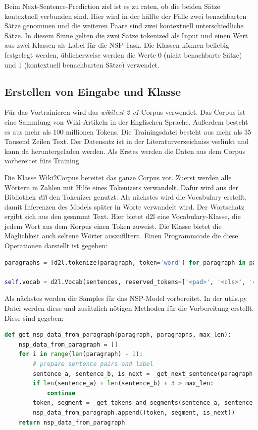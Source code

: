 Beim Next-Sentence-Prediction ziel ist es zu raten, ob die beiden Sätze kontextuell verbunden sind. Hier wird in der hälfte der Fälle zwei benachbarten Sätze genommen und die weiteren Paare sind zwei kontextuell unterschiedliche Sätze. In diesem Sinne gelten die zwei Sätze tokenized als Input und einen Wert aus zwei Klassen als Label für die NSP-Task. Die Klassen können beliebig festgelegt werden, üblicherweise werden die Werte 0 (nicht benachbarte Sätze) und 1 (kontextuell benachbarten Sätze) verwendet. 

\subsection{Erstellen von Eingabe und Klasse}

Für das Vortrainieren wird das \textit{wikitext-2-v1} \cite{wikitext2:20} Corpus verwendet. Das Corpus ist eine Sammlung von Wiki-Artikeln in der Englischen Sprache. Außerdem besteht es aus mehr als 100 millionen Tokens. Die Trainingsdatei besteht aus mehr als 35 Tausend Zeilen Text. Der Datensatz ist in der Literaturverzeichniss verlinkt und kann da heruntergeladen werden. Als Erstes werden die Daten aus dem Corpus vorbereitet fürs Training.

Die Klasse Wiki2Corpus bereitet das ganze Corpus vor. Zuerst werden alle Wörtern in Zahlen mit Hilfe eines Tokenizers verwandelt. Dafür wird aus der Bibliothek \textit{d2l} \cite{d2l:21} den Tokenizer genutzt. Als nächstes wird die Vocabulary erstellt, damit Inferenzen des Models später in Worte verwandelt wird. Der Wortschatz ergibt sich aus den gesammt Text. Hier bietet d2l eine Vocabulary-Klasse, die jedem Wort aus dem Korpus einen Token zuweist. Die Klasse bietet die Möglichkeit auch seltene Wörter auszufiltern. Einen Programmcode die diese Operationen darstellt ist gegeben:

\begin{lstlisting}[language=Python, caption={Nutzung der Dive into Deep Learning (d2l) Bibliothek}]
paragraphs = [d2l.tokenize(paragraph, token='word') for paragraph in paragraphs]

self.vocab = d2l.Vocab(sentences, reserved_tokens=['<pad>', '<cls>', '<sep>', '<mask>'])
\end{lstlisting}

Als nächstes werden die Samples für das NSP-Model vorbereitet. In der utils.py Datei werden diese und zusätzlich nötigen Methoden für die Vorbereitung erstellt. Diese sind gegeben:

\begin{lstlisting}[language=Python, caption={Erstellen der Trainingsdaten für NSP}]	
def get_nsp_data_from_paragraph(paragraph, paragraphs, max_len):
	nsp_data_from_paragraph = []
	for i in range(len(paragraph) - 1):
		# prepare sentence pairs and label
		sentence_a, sentence_b, is_next = _get_next_sentence(paragraph[i], paragraph[i + 1], paragraphs) 
		if len(sentence_a) + len(sentence_b) + 3 > max_len:
			continue
		token, segment = _get_tokens_and_segments(sentence_a, sentence_b) # add keywords
		nsp_data_from_paragraph.append((token, segment, is_next))
	return nsp_data_from_paragraph
\end{lstlisting}

